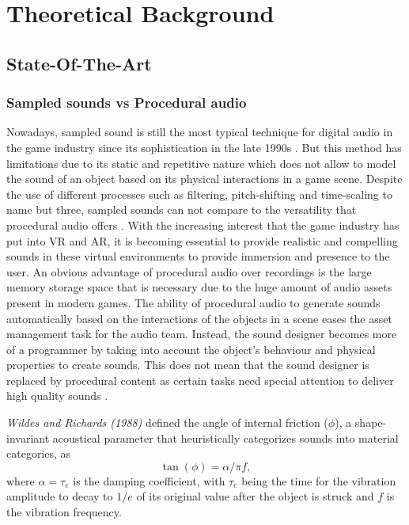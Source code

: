 \chapter{Theoretical Background}\label{ch:theory}

\section{State-Of-The-Art}\label{sec:state_art}

\subsection{Sampled sounds vs Procedural audio}

Nowadays, sampled sound is still the most typical technique for digital audio in the game industry since its sophistication in the late 1990s . But this method has limitations due to its static and repetitive nature which does not allow to model the sound of an object based on its physical interactions in a game scene. Despite the use of different processes such as filtering, pitch-shifting and time-scaling to name but three, sampled sounds can not compare to the versatility that procedural audio offers \cite{farnell2010designing}. With the increasing interest that the game industry has put into \gls{VR} and \gls{AR}, it is becoming essential to provide realistic and compelling sounds in these virtual environments to provide immersion and presence to the user. An obvious advantage of procedural audio over recordings is the large memory storage space that is necessary due to the huge amount of audio assets present in modern games. The ability of procedural audio to generate sounds automatically based on the interactions of the objects in a scene eases the asset management task for the audio team. Instead, the sound designer becomes more of a programmer by taking into account the object’s behaviour and physical properties to create sounds. This does not mean that the sound designer is replaced by procedural content as certain tasks need special attention to deliver high quality sounds \cite{farnell2007introduction}.

\textit{Wildes and Richards (1988)} defined the angle of internal friction ($\phi$), a shape-invariant acoustical parameter that heuristically categorizes sounds into material categories, as
\begin{equation}\label{eq:tanf}
\tan(\phi) = \alpha / \pi f,
\end{equation}
where $\alpha = \tau_e$ is the damping coefficient, with $\tau_e$ being the time for the vibration amplitude to decay to $1/e$ of its original value after the object is struck  and $f$ is the vibration frequency\cite{giordano2006material}.

